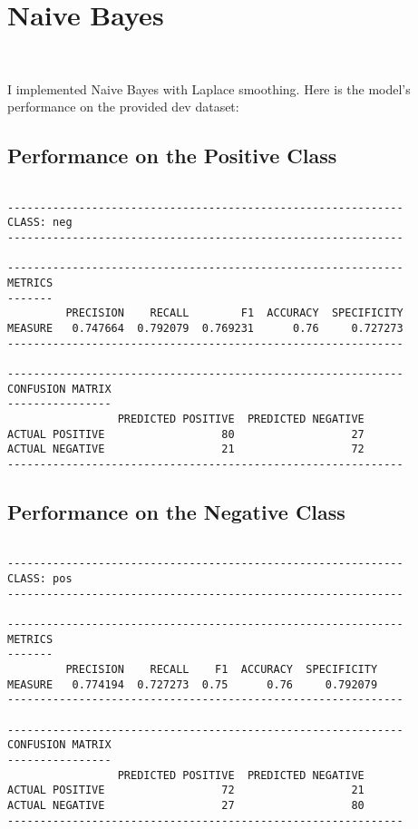 \newcommand{\sperse}[2]{\multirow{#1}{.2\linewidth}{#2}}

\section{Naive Bayes}~\label{sec:introduction}

I implemented Naive Bayes with Laplace smoothing.
Here is the model's performance on the provided dev dataset:

\subsection{Performance on the Positive Class}

\begin{center}
\begin{verbatim}

-------------------------------------------------------------
CLASS: neg
-------------------------------------------------------------

-------------------------------------------------------------
METRICS
-------
         PRECISION    RECALL        F1  ACCURACY  SPECIFICITY
MEASURE   0.747664  0.792079  0.769231      0.76     0.727273
-------------------------------------------------------------

-------------------------------------------------------------
CONFUSION MATRIX
----------------
                 PREDICTED POSITIVE  PREDICTED NEGATIVE
ACTUAL POSITIVE                  80                  27
ACTUAL NEGATIVE                  21                  72
-------------------------------------------------------------
\end{verbatim}
\end{center}

\newpage
\subsection{Performance on the Negative Class}

\begin{center}
\begin{verbatim}

-------------------------------------------------------------
CLASS: pos
-------------------------------------------------------------

-------------------------------------------------------------
METRICS
-------
         PRECISION    RECALL    F1  ACCURACY  SPECIFICITY
MEASURE   0.774194  0.727273  0.75      0.76     0.792079
-------------------------------------------------------------

-------------------------------------------------------------
CONFUSION MATRIX
----------------
                 PREDICTED POSITIVE  PREDICTED NEGATIVE
ACTUAL POSITIVE                  72                  21
ACTUAL NEGATIVE                  27                  80
-------------------------------------------------------------
\end{verbatim}
\end{center}

